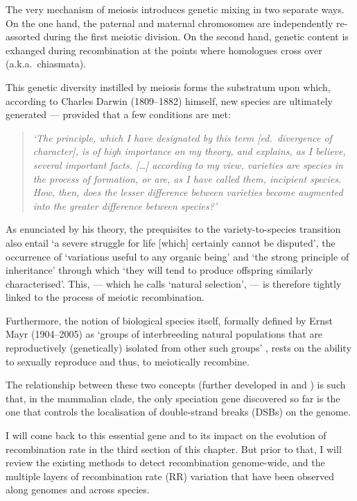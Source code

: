 The very mechanism of meiosis introduces genetic mixing in two separate ways.
On the one hand, the paternal and maternal chromosomes are independently re-assorted during the first meiotic division.
On the second hand, genetic content is exhanged during recombination at the points where homologues cross over (a.k.a.\ chiasmata).

This genetic diversity instilled by meiosis forms the substratum upon which, according to Charles Darwin (1809--1882) himself, new species are ultimately generated — provided that a few conditions are met:

\begin{quote}
	\textit{‘The principle, which I have designated by this term [ed.\ divergence of character], is of high importance on my theory, and explains, as I believe, several important facts. […] according to my view, varieties are species in the process of formation, or are, as I have called them, incipient species. How, then, does the lesser difference between varieties become augmented into the greater difference between species?’}
\end{quote}

As enunciated by his theory, the prequisites to the variety-to-species transition also entail ‘a severe struggle for life [which] certainly cannot be disputed’, the occurrence of ‘variations useful to any organic being’ and ‘the strong principle of inheritance’ through which ‘they will tend to produce offspring similarly characterised’.
This, — which he calls ‘natural selection’, — is therefore tightly linked to the process of meiotic recombination.

Furthermore, the notion of biological species itself, formally defined by Ernst Mayr (1904--2005) as ‘groups of interbreeding natural populations that are reproductively (genetically) isolated from other such groups’ \citep{mayr1999systematics}, rests on the ability to sexually reproduce and thus, to meiotically recombine.

The relationship between these two concepts (further developed in \citealp{felsenstein1981skepticism} and \citealp{butlin2005recombination}) is such that, in the mammalian clade, the only speciation gene discovered so far is the one that controls the localisation of double-strand breaks (DSBs) on the genome.

I will come back to this essential gene and to its impact on the evolution of recombination rate in the third section of this chapter. 
But prior to that, I will review the existing methods to detect recombination genome-wide, and the multiple layers of recombination rate (RR) variation that have been observed along genomes and across species.

